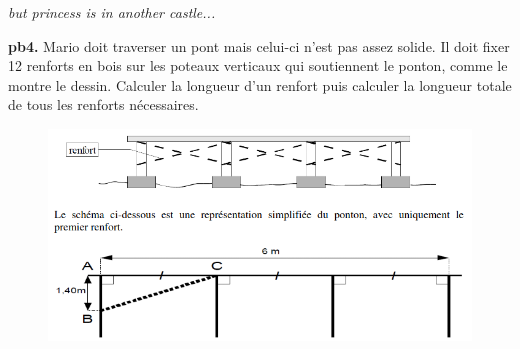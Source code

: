 \Pointilles[2]

\textit{but princess is in another castle...}

\textbf{pb4.}  Mario doit traverser un pont mais celui-ci n'est pas assez solide. Il doit fixer 12 renforts en bois sur les poteaux verticaux qui soutiennent le ponton, comme le montre le dessin. Calculer la longueur d'un renfort puis calculer la longueur totale de tous les renforts nécessaires. 
  
\begin{figure}[H]
  \centering
  \includegraphics[width=0.6\linewidth]{4x5-pythagore/pb4.png}
\end{figure}
\Pointilles[10]


